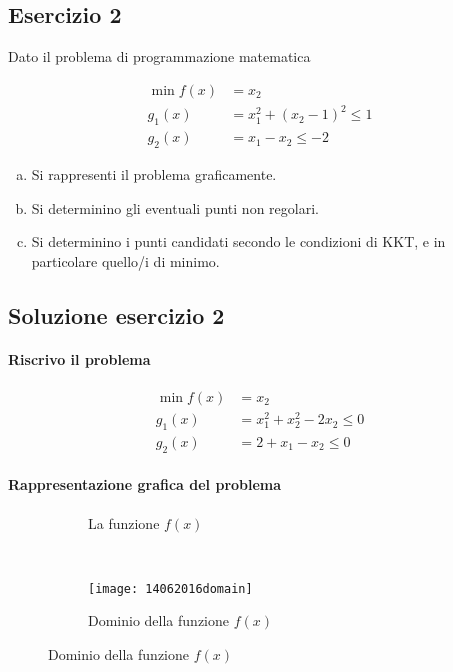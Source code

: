 \documentclass[\main/main.tex]{subfiles}
\begin{document}
\subsection{Esercizio 2}
Dato il problema di programmazione matematica

\begin{align*}
  \min f(x) & =x_2                       \\
  g_1(x)    & = x_1^2 + (x_2-1)^2 \leq 1 \\
  g_2(x)    & = x_1 - x_2 \leq -2
\end{align*}

\begin{enumerate}[a)]
  \item Si rappresenti il problema graficamente.
  \item Si determinino gli eventuali punti non regolari.
  \item Si determinino i punti candidati secondo le condizioni di KKT, e in particolare quello/i di minimo.
\end{enumerate}

\subsection{Soluzione esercizio 2}

\paragraph*{Riscrivo il problema}

\begin{align*}
  \min f(x) & =x_2                         \\
  g_1(x)    & = x_1^2 + x^2_2 -2x_2 \leq 0 \\
  g_2(x)    & = 2 + x_1 - x_2 \leq 0
\end{align*}

\paragraph*{Rappresentazione grafica del problema}

\begin{figure}
  \begin{subfigure}{0.45\textwidth}
    \caption{La funzione $f(x)$}
    \label{func}
  \end{subfigure}
  ~
  \begin{subfigure}{0.45\textwidth}
    \texttt{[image: 14062016domain]}
    \caption{Dominio della funzione $f(x)$}
  \end{subfigure}
\end{figure}
\end{document}
